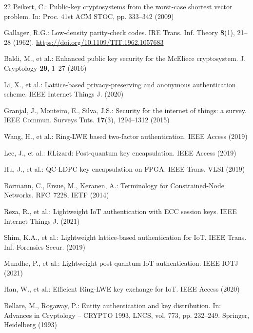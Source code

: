 \documentclass[runningheads]{llncs}
\begin{document}
\begin{thebibliography}{22}
Peikert, C.: Public-key cryptosystems from the worst-case shortest vector
problem. In: Proc. 41st ACM STOC, pp. 333--342 (2009)

Gallager, R.G.: Low-density parity-check codes. IRE Trans. Inf. Theory
\textbf{8}(1), 21--28 (1962).
\url{https://doi.org/10.1109/TIT.1962.1057683}

Baldi, M., et al.: Enhanced public key security for the {McEliece} cryptosystem.
J. Cryptology \textbf{29}, 1--27 (2016)

Li, X., et al.: Lattice-based privacy-preserving and anonymous authentication
scheme. IEEE Internet Things J. (2020)

Granjal, J., Monteiro, E., Silva, J.S.: Security for the internet of things:
a survey. IEEE Commun. Surveys Tuts. \textbf{17}(3), 1294--1312 (2015)

Wang, H., et al.: Ring-{LWE} based two-factor authentication. IEEE Access (2019)

Lee, J., et al.: {RLizard}: Post-quantum key encapsulation. IEEE Access (2019)

Hu, J., et al.: {QC-LDPC} key encapsulation on {FPGA}. IEEE Trans. VLSI (2019)

Bormann, C., Ersue, M., Keranen, A.: Terminology for Constrained-Node Networks.
RFC~7228, IETF (2014)

Reza, R., et al.: Lightweight {IoT} authentication with {ECC} session keys.
IEEE Internet Things J. (2021)

Shim, K.A., et al.: Lightweight lattice-based authentication for IoT.
IEEE Trans. Inf. Forensics Secur. (2019)

Mundhe, P., et al.: Lightweight post-quantum IoT authentication. IEEE IOTJ (2021)

Han, W., et al.: Efficient Ring-LWE key exchange for IoT. IEEE Access (2020)

Bellare, M., Rogaway, P.: Entity authentication and key distribution.
In: Advances in Cryptology -- CRYPTO 1993, LNCS, vol. 773, pp. 232--249.
Springer, Heidelberg (1993)

\end{thebibliography}
\end{document}

